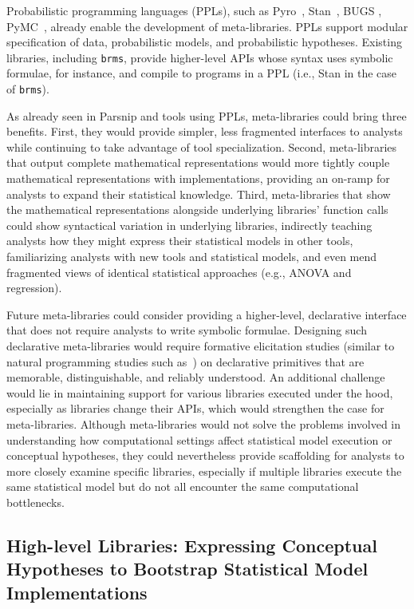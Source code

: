 Probabilistic programming languages (PPLs), such as Pyro~\cite{pyro}, Stan~\cite{stan},
BUGS \cite{bugs}, PyMC~\cite{pymc3}, already enable the development of
meta-libraries. PPLs support modular specification of data, probabilistic
models, and probabilistic hypotheses. Existing libraries, including
\texttt{brms}, provide higher-level APIs whose syntax uses symbolic formulae,
for instance, and compile to programs in a PPL (i.e., Stan in the case of
\texttt{brms}). 

As already seen in Parsnip and tools using PPLs, meta-libraries could
bring three benefits. First, they would provide simpler, less fragmented
interfaces to analysts while continuing to take advantage of tool
specialization. Second, meta-libraries that output complete mathematical
representations would more tightly couple mathematical representations with
implementations, providing an on-ramp for analysts to expand their statistical
knowledge. Third, meta-libraries that show the mathematical representations
alongside underlying libraries' function calls could show syntactical variation
in underlying libraries, indirectly teaching analysts how they might express
their statistical models in other tools, familiarizing analysts with new tools
and statistical models, and even mend fragmented views of identical statistical approaches (e.g., ANOVA and
regression). 

Future meta-libraries could consider providing a higher-level, declarative
interface that does not require analysts to write symbolic formulae. Designing
such declarative meta-libraries would require formative elicitation studies
(similar to natural programming studies such as~\cite{verou2018extending}) on
declarative primitives that are memorable, distinguishable, and reliably
understood. An additional challenge would lie in maintaining support for various
libraries executed under the hood, especially as libraries change their APIs,
which would strengthen the case for meta-libraries. Although meta-libraries
would not solve the problems involved in understanding how computational
settings affect statistical model execution or conceptual hypotheses, they could
nevertheless provide scaffolding for analysts to more closely examine specific
libraries, especially if multiple libraries execute the same statistical model but do not
all encounter the same computational bottlenecks. 

\subsection*{High-level Libraries: Expressing Conceptual Hypotheses to Bootstrap Statistical Model Implementations}

